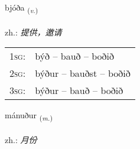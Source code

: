 \documentclass[frontgrid, backgrid]{flacards}\usepackage[]{graphicx}\usepackage[]{xcolor}
\begin{document}
\renewcommand{\blhead}{\vskip5pt {\small\bfseries\footnotesize Sagnorð | 动词 }}
\renewcommand{\bcfoot}{\vskip5pt \hspace{2pt}{\small\bfseries\footnotesize 1K}}


{bjóða \small{\textsubscript{(\textit{v.})}} \\[1ex] %
\textphonetic{[pjouːða]} \\
zh.: \emph{提供，邀请} \\  [2ex]
\renewcommand*{\arraystretch}{0.8}
\begin{tabular}{p{1cm}l}
\textsc{1sg}: & býð -- bauð -- boðið \\ 
\textsc{2sg}: & býður -- bauðst -- boðið \\ 
\textsc{3sg}: & býður -- bauð -- boðið \\ 
\end{tabular}
}

\renewcommand{\flhead}{\vskip5pt \fboxsep=0pt {\small\bfseries\footnotesize Nafnorð | 名词}}
\renewcommand{\fcfoot}{\vskip5pt \fboxsep=0pt \hspace{2pt}{\small\bfseries\footnotesize 1K}}

\renewcommand{\blhead}{\vskip5pt {\small\bfseries\footnotesize Nafnorð | 名词 }}
\renewcommand{\bcfoot}{\vskip5pt \hspace{2pt}{\small\bfseries\footnotesize 1K}}


{mánuður \small{\textsubscript{(\textit{m.})}} \\[1ex] %
\textphonetic{[mauːnʏðʏr]} \\
zh.: \emph{月份} \\  [2ex]
\renewcommand*{\arraystretch}{0.8}
}

\renewcommand{\flhead}{\vskip5pt \fboxsep=0pt {\small\bfseries\footnotesize Lýsingarorð | 形容词}}
\renewcommand{\fcfoot}{\vskip5pt \fboxsep=0pt \hspace{2pt}{\small\bfseries\footnotesize 1K}}
\end{document}
